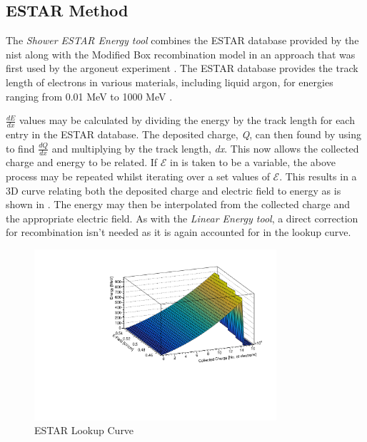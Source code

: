 \subsection{ESTAR Method}
The \textit{Shower ESTAR Energy tool} combines the ESTAR database provided by the \gls{nist} along with the Modified Box recombination model in an approach that was first used by the \Gls{argoneut} experiment \cite{ArgoNeuT_ESTAR_paper}. The ESTAR database provides the track length of electrons in various materials, including liquid argon, for energies ranging from 0.01 MeV to 1000 MeV \cite{ESTAR_Database}.

$\frac{dE}{dx}$ values may be calculated by dividing the energy by the track length for each entry in the ESTAR database. The deposited charge, \textit{Q}, can then found by using  to find $\frac{dQ}{dx}$ and multiplying by the track length, \textit{dx}. This now allows the collected charge and energy to be related. If $\mathcal{E}$ in  is taken to be a variable, the above process may be repeated whilst iterating over a set values of $\mathcal{E}$. This results in a 3D curve relating both the deposited charge and electric field to energy as is shown in . The energy may then be interpolated from the collected charge and the appropriate electric field. As with the \textit{Linear Energy tool}, a direct correction for recombination isn't needed as it is again accounted for in the lookup curve. 

\begin{figure}[h]
    \centering
    \includegraphics[width = 0.8\textwidth]{figures-chap4/ESTAR_lookup_curve.pdf}
    \caption{ESTAR Lookup Curve}
    \label{fig:ESTAR lookup curve}
\end{figure}

